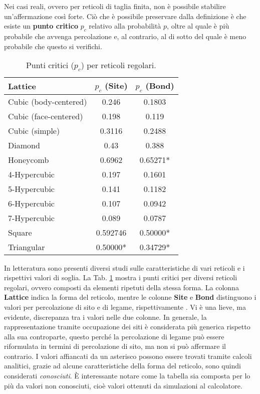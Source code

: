 Nei casi reali, ovvero per reticoli di taglia finita, non è possibile stabilire
un'affermazione così forte. 
Ciò che è possibile preservare dalla definizione 
è che esiste un \textbf{punto critico} $p_c$ relativo alla probabilità $p$, oltre 
al quale è più probabile che avvenga percolazione e, al contrario, al di sotto
del quale è meno probabile che questo si verifichi.

\begin{table}[ht!]
    \centering
    \begin{tabular}{lcc}
    \toprule
    \textbf{Lattice} & \textbf{\(p_c\) (Site)} & \textbf{\(p_c\) (Bond)} \\
    \midrule
    Cubic (body-centered) & 0.246    & 0.1803    \\
    Cubic (face-centered) & 0.198    & 0.119     \\
    Cubic (simple)        & 0.3116   & 0.2488    \\
    Diamond               & 0.43     & 0.388     \\
    Honeycomb             & 0.6962   & 0.65271*  \\
    4-Hypercubic          & 0.197    & 0.1601    \\
    5-Hypercubic          & 0.141    & 0.1182    \\
    6-Hypercubic          & 0.107    & 0.0942    \\
    7-Hypercubic          & 0.089    & 0.0787    \\
    Square                & 0.592746 & 0.50000*  \\
    Triangular            & 0.50000* & 0.34729*  \\
    \bottomrule
    \end{tabular}
    \caption{Punti critici (\(p_c\)) per reticoli regolari.}
    \label{tab:percolation}
\end{table}

In letteratura sono presenti diversi studi sulle caratteristiche di vari 
reticoli e i rispettivi valori di soglia. La Tab. \ref{tab:percolation}
mostra i punti critici per diversi reticoli regolari, ovvero composti
da elementi ripetuti della stessa forma. La colonna \textbf{Lattice} indica la forma 
del reticolo, mentre le colonne \textbf{Site} e \textbf{Bond} distinguono i valori 
per percolazione di sito e di legame, rispettivamente \cite{stauffer-threshold}.
Vi è una lieve, ma evidente, discrepanza tra i valori nelle due colonne.
In generale, la rappresentazione tramite occupazione dei siti è considerata
più generica rispetto alla sua controparte, questo perché la percolazione di legame
può essere riformulata in termini di percolazione di sito, 
ma non si può affermare il contrario.
I valori affiancati da un asterisco possono essere trovati tramite calcoli analitici,
grazie ad alcune caratteristiche della forma del reticolo,
sono quindi considerati \textit{conosciuti}. È interessante notare come la 
tabella sia composta per lo più da valori non conosciuti, cioè valori ottenuti da 
simulazioni al calcolatore.

